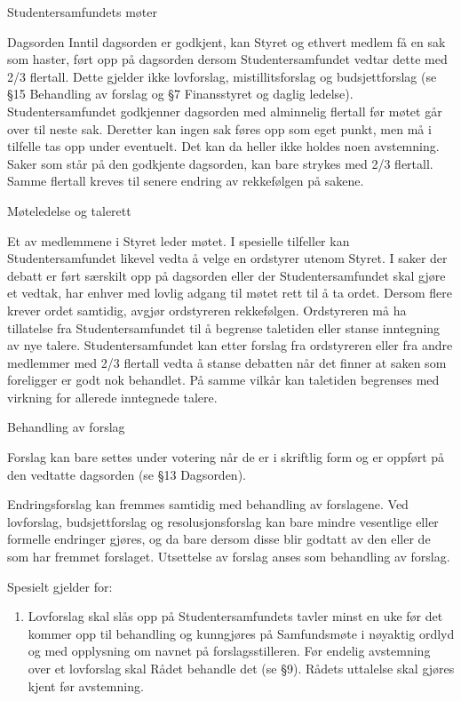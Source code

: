 \begin{lovkapittel}{Studentersamfundets møter}
\begin{lovparagraf}{Dagsorden}
Inntil dagsorden er godkjent, kan Styret og ethvert medlem få en sak som haster, ført opp på dagsorden dersom
Studentersamfundet vedtar dette med 2/3 flertall. Dette gjelder ikke lovforslag, mistillitsforslag og budsjettforslag (se
§15 Behandling av forslag og §7 Finansstyret og daglig ledelse). Studentersamfundet godkjenner dagsorden med
alminnelig flertall før møtet går over til neste sak. Deretter kan ingen sak føres opp som eget punkt, men må i tilfelle
tas opp under eventuelt. Det kan da heller ikke holdes noen avstemning. Saker som står på den godkjente dagsorden,
kan bare strykes med 2/3 flertall. Samme flertall kreves til senere endring av rekkefølgen på sakene.

  \end{lovparagraf}
  
  \begin{lovparagraf}{Møteledelse og talerett}

Et av medlemmene i Styret leder møtet. I spesielle tilfeller kan Studentersamfundet likevel vedta å velge en ordstyrer
utenom Styret. I saker der debatt er ført særskilt opp på dagsorden eller der Studentersamfundet skal gjøre et vedtak,
har enhver med lovlig adgang til møtet rett til å ta ordet. Dersom flere krever ordet samtidig, avgjør ordstyreren
rekkefølgen. Ordstyreren må ha tillatelse fra Studentersamfundet til å begrense taletiden eller stanse inntegning av nye
talere. Studentersamfundet kan etter forslag fra ordstyreren eller fra andre medlemmer med 2/3 flertall vedta å stanse
debatten når det finner at saken som foreligger er godt nok behandlet. På samme vilkår kan taletiden begrenses med
virkning for allerede inntegnede talere.

  \end{lovparagraf}
  
  \begin{lovparagraf}{Behandling av forslag}

Forslag kan bare settes under votering når de er i skriftlig form og er oppført på den vedtatte dagsorden (se §13
Dagsorden).

Endringsforslag kan fremmes samtidig med behandling av forslagene. Ved lovforslag, budsjettforslag og
resolusjonsforslag kan bare mindre vesentlige eller formelle endringer gjøres, og da bare dersom disse blir godtatt av
den eller de som har fremmet forslaget. Utsettelse av forslag anses som behandling av forslag.

Spesielt gjelder for:
\begin{enumerate}
\item Lovforslag skal slås opp på Studentersamfundets tavler minst en uke før det kommer opp til behandling og
kunngjøres på Samfundsmøte i nøyaktig ordlyd og med opplysning om navnet på forslagsstilleren. Før
endelig avstemning over et lovforslag skal Rådet behandle det (se §9). Rådets uttalelse skal gjøres kjent før
avstemning.


\end{enumerate}
\end{lovparagraf}
\end{lovkapittel}
